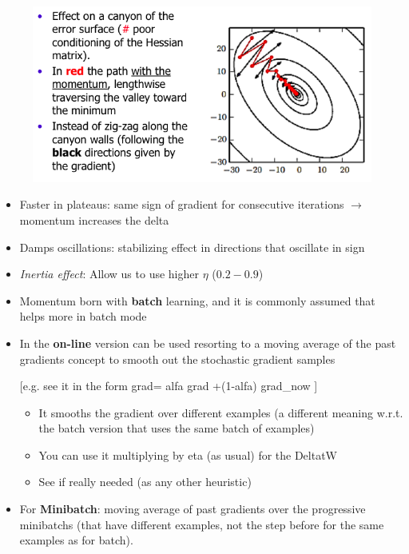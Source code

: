 \documentclass[../main.tex]{subfiles}
\begin{document}
\begin{figure}[H]
    \centering
    \includegraphics[scale = 0.50]{lectures/4_neural_networks/4_momentum_plot.png}
    \label{fig:4_momentum_plot}
\end{figure}
\begin{itemize}
    \item Faster in plateaus: same sign of gradient for consecutive iterations $\rightarrow$ momentum increases the delta
    \item Damps oscillations: stabilizing effect in directions that oscillate in sign
    \item \emph{Inertia effect}: Allow us to use higher $\eta$ ($0.2 - 0.9$)
    \item Momentum born with \textbf{batch} learning, and it is commonly assumed that helps more in batch mode
    \item In the \textbf{on-line} version can be used resorting to a moving average of the past gradients concept to smooth out the stochastic gradient samples
    
    [e.g. see it in the form grad= alfa grad +(1-alfa) grad\_now ]
    \begin{itemize}
        \item It smooths the gradient over different examples (a different meaning w.r.t. the batch version that uses the same batch of examples)
        \item You can use it multiplying by eta (as usual) for the DeltatW
        \item See if really needed (as any other heuristic)
    \end{itemize}
    
    \item For \textbf{Minibatch}: moving average of past gradients over the progressive minibatchs (that have different examples, not the step before for the same examples as for batch).
\end{itemize}
\end{document}
